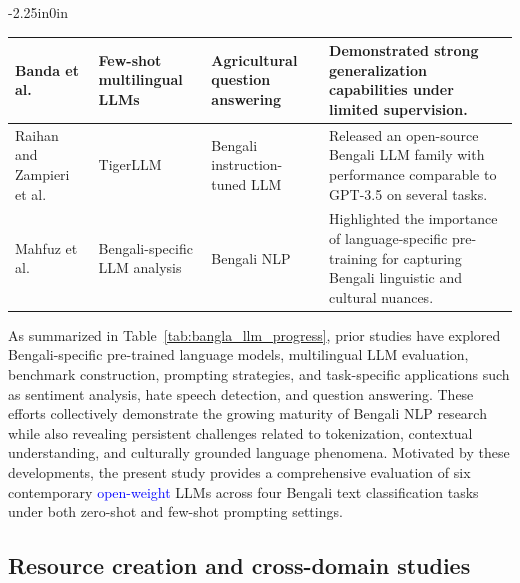 \documentclass[10pt,letterpaper]{article}
\newcommand{\rev}[1]{\textcolor{blue}{#1}}
\begin{document}
\begin{table}[!t]
\begin{adjustwidth}{-2.25in}{0in}
\begin{tabular}{|>{\raggedright\arraybackslash}p{3cm}|>{\raggedright\arraybackslash}p{3.0cm}|>{\raggedright\arraybackslash}p{3.0cm}|>{\raggedright\arraybackslash}p{8.1cm}|}
\hline
Banda et al.~\cite{b9} & Few-shot multilingual LLMs & Agricultural question answering & Demonstrated strong generalization capabilities under limited supervision. \\
\hline
Raihan and Zampieri et al.~\cite{b10} & TigerLLM & Bengali instruction-tuned LLM & Released an open-source Bengali LLM family with performance comparable to GPT-3.5 on several tasks. \\
\hline
Mahfuz et al.~\cite{b11} & Bengali-specific LLM analysis & Bengali NLP & Highlighted the importance of language-specific pre-training for capturing Bengali linguistic and cultural nuances. \\
\hline
\end{tabular}
\end{adjustwidth}
\end{table}

As summarized in Table~\ref{tab:bangla_llm_progress}, prior studies have explored Bengali-specific pre-trained language models, multilingual LLM evaluation, benchmark construction, prompting strategies, and task-specific applications such as sentiment analysis, hate speech detection, and question answering. These efforts collectively demonstrate the growing maturity of Bengali NLP research while also revealing persistent challenges related to tokenization, contextual understanding, and culturally grounded language phenomena. Motivated by these developments, the present study provides a comprehensive evaluation of six contemporary \rev{open-weight} LLMs across four Bengali text classification tasks under both zero-shot and few-shot prompting settings.



\subsection*{Resource creation and cross-domain studies}
\end{document}
